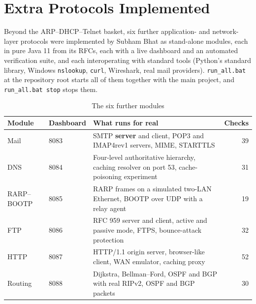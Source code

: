 \documentclass[11pt,a4paper]{article}
\begin{document}
\section{Extra Protocols Implemented}
\label{sec:extra}
Beyond the ARP--DHCP--Telnet basket, six further application- and network-layer protocols were implemented by Subham Bhat as stand-alone modules, each in pure Java 11 from its RFCs, each with a live dashboard and an automated verification suite, and each interoperating with standard tools (Python's standard library, Windows \texttt{nslookup}, \texttt{curl}, Wireshark, real mail providers). \texttt{run\_all.bat} at the repository root starts all of them together with the main project, and \texttt{run\_all.bat stop} stops them.

\begin{table}[H]
\centering
\caption{The six further modules}
\small
\begin{tabularx}{\textwidth}{@{}llYr@{}}
\toprule
\textbf{Module} & \textbf{Dashboard} & \textbf{What runs for real} & \textbf{Checks} \\ \midrule
Mail & 8083 & SMTP \textbf{server} and client, POP3 and IMAP4rev1 servers, MIME, STARTTLS & 39 \\
DNS & 8084 & Four-level authoritative hierarchy, caching resolver on port 53, cache-poisoning experiment & 31 \\
RARP--BOOTP & 8085 & RARP frames on a simulated two-LAN Ethernet, BOOTP over UDP with a relay agent & 19 \\
FTP & 8086 & RFC 959 server and client, active and passive mode, FTPS, bounce-attack protection & 32 \\
HTTP & 8087 & HTTP/1.1 origin server, browser-like client, WAN emulator, caching proxy & 52 \\
Routing & 8088 & Dijkstra, Bellman--Ford, OSPF and BGP with real RIPv2, OSPF and BGP packets & 30 \\ \bottomrule
\end{tabularx}
\end{table}
\end{document}
